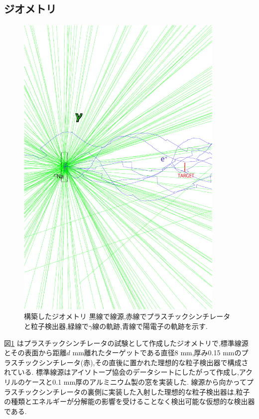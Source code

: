 \subsection{ジオメトリ}

\begin{figure}[!tbp]
	\centering
		\includegraphics[width=10cm]{img/test1_geometry.pdf}
	\caption[構築したジオメトリ]{構築したジオメトリ \newline 黒線で線源,赤線でプラスチックシンチレータと粒子検出器,緑線で$\gamma$線の軌跡,青線で陽電子の軌跡を示す.}
	\label{test1_geometry}
\end{figure}

図\ref{test1_geometry} はプラスチックシンチレータの試験として作成したジオメトリで,標準線源とその表面から距離$d$ mm離れたターゲットである直径8 mm,厚み0.15 mmのプラスチックシンチレータ(赤),その直後に置かれた理想的な粒子検出器で構成されている.
標準線源はアイソトープ協会のデータシートにしたがって作成し,アクリルのケースと0.1 mm厚のアルミニウム製の窓を実装した.
線源から向かってプラスチックシンチレータの裏側に実装した入射した理想的な粒子検出器は,粒子の種類とエネルギーが分解能の影響を受けることなく検出可能な仮想的な検出器である.

